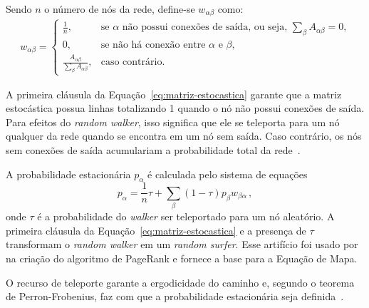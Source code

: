 \documentclass[12pt,a4paper]{article}
\begin{document}
Sendo $n$ o número de nós da rede, define-se $w_{\alpha \beta}$ como:
\begin{align} \label{eq:matriz-estocastica}
w_{\alpha \beta} = 
\begin{cases*}
\frac{1}{n}, & \text{se $\alpha$ não possui conexões de saída, ou seja, $\sum_\beta A_{\alpha \beta} = 0$,} \\
0, & \text{se não há conexão entre $\alpha$ e $\beta$,} \\
\frac{A_{\alpha \beta}}{\sum_\beta A_{\alpha \beta}}, & \text{caso contrário.}
\end{cases*}
\end{align}

A primeira cláusula da Equação~\ref{eq:matriz-estocastica} garante que a matriz estocástica possua linhas totalizando 1 quando o nó não possui conexões de saída. Para efeitos do \textit{random walker}, isso significa que ele se teleporta para um nó qualquer da rede quando se encontra em um nó sem saída. Caso contrário, os nós sem conexões de saída acumulariam a probabilidade total da rede~\cite{Page1999-ag}.

A probabilidade estacionária $p_\alpha$ é calculada pelo sistema de equações
\begin{equation} \label{eq:page-rank}
p_\alpha = \frac{1}{n} \tau + \sum_\beta (1 - \tau) p_\beta w_{\beta \alpha}\,,
\end{equation}
onde $\tau$ é a probabilidade do \textit{walker} ser teleportado para um nó aleatório. A primeira cláusula da Equação~\ref{eq:matriz-estocastica} e a presença de $\tau$ transformam o \textit{random walker} em um \textit{random surfer}. Esse artifício foi usado por~ na criação do algoritmo de PageRank e fornece a base para a Equação de Mapa.

O recurso de teleporte garante a ergodicidade do caminho e, segundo o teorema de Perron-Frobenius, faz com que a probabilidade estacionária seja definida~\cite{Rosvall2009-sd}.
\end{document}
